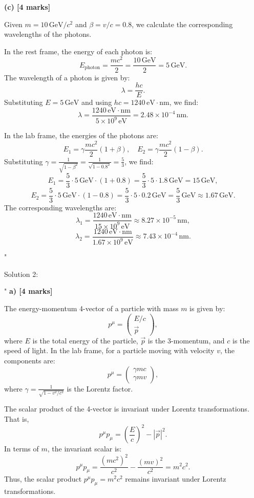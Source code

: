 \textbf{(c) [4 marks]}

Given \(m = 10 \, \text{GeV}/c^2\) and \(\beta = v/c = 0.8\), we calculate the corresponding wavelengths of the photons. 

In the rest frame, the energy of each photon is:
\[
E_\text{photon} = \frac{mc^2}{2} = \frac{10 \, \text{GeV}}{2} = 5 \, \text{GeV}.
\]
The wavelength of a photon is given by:
\[
\lambda = \frac{hc}{E}.
\]
Substituting \(E = 5 \, \text{GeV}\) and using \(hc = 1240 \, \text{eV} \cdot \text{nm}\), we find:
\[
\lambda = \frac{1240 \, \text{eV} \cdot \text{nm}}{5 \times 10^9 \, \text{eV}} = 2.48 \times 10^{-4} \, \text{nm}.
\]

In the lab frame, the energies of the photons are:
\[
E_1 = \gamma \frac{mc^2}{2} (1 + \beta), \quad E_2 = \gamma \frac{mc^2}{2} (1 - \beta).
\]
Substituting \(\gamma = \frac{1}{\sqrt{1 - \beta^2}} = \frac{1}{\sqrt{1 - 0.8^2}} = \frac{5}{3}\), we find:
\[
E_1 = \frac{5}{3} \cdot 5 \, \text{GeV} \cdot (1 + 0.8) = \frac{5}{3} \cdot 5 \cdot 1.8 \, \text{GeV} = 15 \, \text{GeV},
\]
\[
E_2 = \frac{5}{3} \cdot 5 \, \text{GeV} \cdot (1 - 0.8) = \frac{5}{3} \cdot 5 \cdot 0.2 \, \text{GeV} = \frac{5}{3} \, \text{GeV} \approx 1.67 \, \text{GeV}.
\]
The corresponding wavelengths are:
\[
\lambda_1 = \frac{1240 \, \text{eV} \cdot \text{nm}}{15 \times 10^9 \, \text{eV}} \approx 8.27 \times 10^{-5} \, \text{nm},
\]
\[
\lambda_2 = \frac{1240 \, \text{eV} \cdot \text{nm}}{1.67 \times 10^9 \, \text{eV}} \approx 7.43 \times 10^{-4} \, \text{nm}.
\]

"

Solution 2: 

"
\textbf{a) [4 marks]} 

The energy-momentum 4-vector of a particle with mass \(m\) is given by:
\[
p^\mu = \begin{pmatrix} E/c \\ \vec{p} \end{pmatrix},
\]
where \(E\) is the total energy of the particle, \(\vec{p}\) is the 3-momentum, and \(c\) is the speed of light. In the lab frame, for a particle moving with velocity \(v\), the components are:
\[
p^\mu = \begin{pmatrix} \gamma mc \\ \gamma mv \end{pmatrix},
\]
where \(\gamma = \frac{1}{\sqrt{1 - v^2/c^2}}\) is the Lorentz factor.

The scalar product of the 4-vector is invariant under Lorentz transformations. That is,
\[
p^\mu p_\mu = \left(\frac{E}{c}\right)^2 - |\vec{p}|^2.
\]
In terms of \(m\), the invariant scalar is:
\[
p^\mu p_\mu = \frac{(mc^2)^2}{c^2} - \frac{(mv)^2}{c^2} = m^2c^2.
\]
Thus, the scalar product \(p^\mu p_\mu = m^2c^2\) remains invariant under Lorentz transformations.

